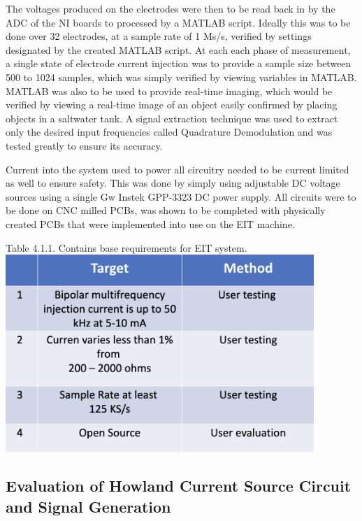 \documentclass[12pt]{article}
\begin{document}
The voltages produced on the electrodes were then to be read back in by
the ADC of the NI boards to processed by a MATLAB script. Ideally this
was to be done over 32 electrodes, at a sample rate of 1 Ms/s, verified
by settings designated by the created MATLAB script. At each each phase
of measurement, a single state of electrode current injection was to
provide a sample size between 500 to 1024 samples, which was simply
verified by viewing variables in MATLAB. MATLAB was also to be used to
provide real-time imaging, which would be verified by viewing a
real-time image of an object easily confirmed by placing objects in a
saltwater tank. A signal extraction technique was used to extract only
the desired input frequencies called Quadrature Demodulation and was
tested greatly to ensure its accuracy.

Current into the system used to power all circuitry needed to be current
limited as well to ensure safety. This was done by simply using
adjustable DC voltage sources using a single Gw Instek GPP-3323 DC power
supply. All circuits were to be done on CNC milled PCBs, was shown to be
completed with physically created PCBs that were implemented into use on
the EIT machine.
\begin{center}
    Table 4.1.1. Contains base requirements for EIT system.\\
    \includegraphics[width=4.59375in,height=2.94in]{media/image9.png}
\end{center}



\subsection{Evaluation of Howland Current Source Circuit and Signal Generation}\label{evaluation-of-howland-current-source-circuit-and-signal-generation}
\end{document}
